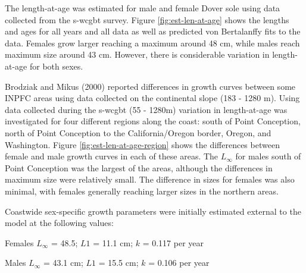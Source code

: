 \documentclass[11pt,
  english,
  a4paper,
]{article}
\begin{document}

The length-at-age was estimated for male and female Dover sole using data collected from the \Gls{s-wcgbt} survey. Figure \ref{fig:est-len-at-age} shows the lengths and ages for all years and all data as well as predicted von Bertalanffy fits to the data. Females grow larger reaching a maximum around 48 cm, while males reach maximum size around 43 cm. However, there is considerable variation in length-at-age for both sexes.

\leavevmode\tagmcend\tagstructend\par


Brodziak and Mikus {(2000)\leavevmode\tagmcend\tagstructend} reported differences in growth curves between some INPFC areas using data collected on the continental slope (183 - 1280 m). Using data collected during the \Gls{s-wcgbt} (55 - 1280m) variation in length-at-age was investigated for four different regions along the coast: south of Point Conception, north of Point Conception to the California/Oregon border, Oregon, and Washington. Figure \ref{fig:est-len-at-age-region} shows the differences between female and male growth curves in each of these areas. The {\(L_{\infty}\)\leavevmode\tagmcend\tagstructend} for males south of Point Conception was the largest of the areas, although the differences in maximum size were relatively small. The difference in sizes for females was also minimal, with females generally reaching larger sizes in the northern areas.

\leavevmode\tagmcend\tagstructend\par


Coastwide sex-specific growth parameters were initially estimated external to the model at the following values:

\leavevmode\tagmcend\tagstructend\par

\begin{centering}

Females $L_{\infty}$ = 48.5; $L1$ = 11.1 cm; $k$ = 0.117 per year

Males $L_{\infty}$ = 43.1 cm; $L1$ = 15.5 cm; $k$ = 0.106 per year

\end{centering}
\end{document}
